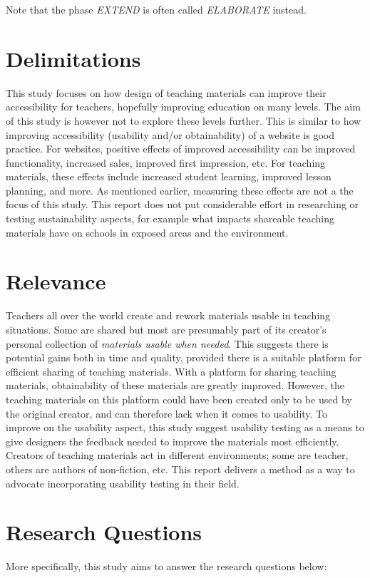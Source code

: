 Note that the phase \textit{EXTEND} is often called \textit{ELABORATE} instead.

\section{Delimitations}
This study focuses on how design of teaching materials can improve their accessibility for teachers, hopefully improving education on many levels. The aim of this study is however not to explore these levels further. This is similar to how improving accessibility (usability and/or obtainability) of a website is good practice. For websites, positive effects of improved accessibility can be improved functionality, increased sales, improved first impression, etc. For teaching materials, these effects include increased student learning, improved lesson planning, and more. As mentioned earlier, measuring these effects are not a the focus of this study.
This report does not put considerable effort in researching or testing sustainability aspects, for example what impacts shareable teaching materials have on schools in exposed areas and the environment.

\section{Relevance}
Teachers all over the world create and rework materials usable in teaching situations. Some are shared but most are presumably part of its creator's personal collection of \textit{materials usable when needed}. This suggests there is potential gains both in time and quality, provided there is a suitable platform for efficient sharing of teaching materials.
With a platform for sharing teaching materials, obtainability of these materials are greatly improved. However, the teaching materials on this platform could have been created only to be used by the original creator, and can therefore lack when it comes to usability. To improve on the usability aspect, this study suggest usability testing as a means to give designers the feedback needed to improve the materials most efficiently.
Creators of teaching materials act in different environments; some are teacher, others are authors of non-fiction, etc. This report delivers a method as a way to advocate incorporating usability testing in their field.

\section{Research Questions}
More specifically, this study aims to answer the research questions below:

